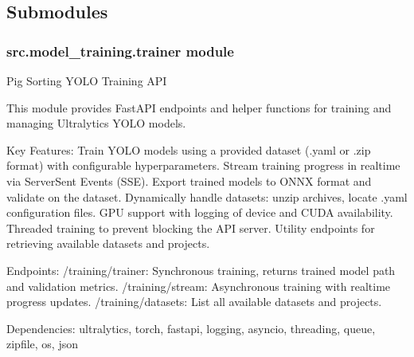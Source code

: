 \documentclass[letterpaper,10pt,english]{sphinxmanual}
\begin{document}
\subsection{Submodules}
\label{\detokenize{modules/src.model_training:submodules}}
\sphinxstepscope


\subsubsection{src.model\_training.trainer module}
\label{\detokenize{modules/src.model_training.trainer:module-src.model_training.trainer}}\label{\detokenize{modules/src.model_training.trainer:src-model-training-trainer-module}}\label{\detokenize{modules/src.model_training.trainer::doc}}
\sphinxAtStartPar
Pig Sorting YOLO Training API

\sphinxAtStartPar
This module provides FastAPI endpoints and helper functions for training and managing Ultralytics YOLO models.

\sphinxAtStartPar
Key Features:
\sphinxhyphen{} Train YOLO models using a provided dataset (.yaml or .zip format) with configurable hyperparameters.
\sphinxhyphen{} Stream training progress in real\sphinxhyphen{}time via Server\sphinxhyphen{}Sent Events (SSE).
\sphinxhyphen{} Export trained models to ONNX format and validate on the dataset.
\sphinxhyphen{} Dynamically handle datasets: unzip archives, locate .yaml configuration files.
\sphinxhyphen{} GPU support with logging of device and CUDA availability.
\sphinxhyphen{} Threaded training to prevent blocking the API server.
\sphinxhyphen{} Utility endpoints for retrieving available datasets and projects.

\sphinxAtStartPar
Endpoints:
\sphinxhyphen{} /training/trainer: Synchronous training, returns trained model path and validation metrics.
\sphinxhyphen{} /training/stream: Asynchronous training with real\sphinxhyphen{}time progress updates.
\sphinxhyphen{} /training/datasets: List all available datasets and projects.

\sphinxAtStartPar
Dependencies:
\sphinxhyphen{} ultralytics, torch, fastapi, logging, asyncio, threading, queue, zipfile, os, json
\end{document}
